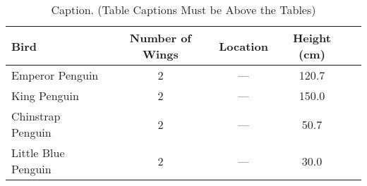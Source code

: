 \begin{table}[!ht]
\centering
\caption{Caption. (Table Captions Must be Above the Tables)}
\setlength\tabcolsep{9pt}
\renewcommand{\arraystretch}{1}
\begin{tabular}{l|c|ccc}
\toprule
\textbf{Bird} & \textbf{Number of Wings} & \textbf{Location} & \textbf{Height (cm)} \\
\midrule

Emperor Penguin & \num{2}  & --- & \num{120.7} \\
King Penguin & \num{2}  & --- & \num{150.0} \\ 
Chinstrap Penguin & \num{2}  & --- & \num{50.7} \\ 
Little Blue Penguin & \num{2}  & --- & \num{30.0} \\ 

\bottomrule
\end{tabular}
\label{tab:example_pinguins2}
\end{table}